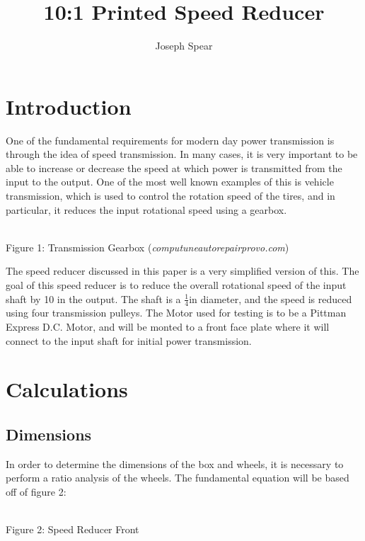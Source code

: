 \documentclass{article}
\begin{document}
\title{10:1 Printed Speed Reducer}
\author{Joseph Spear}

\maketitle


\section{Introduction}
One of the fundamental requirements for modern day power transmission is through the idea of speed transmission. In many cases, it is very important to be able to increase or decrease the speed at which power is transmitted from the input to the output. One of the most well known examples of this is vehicle transmission, which is used to control the rotation speed of the tires, and in particular, it reduces the input rotational speed using a gearbox.

\begin{center}
\\
\scriptsize{
Figure 1: Transmission Gearbox (\textit{computuneautorepairprovo.com})
}
\end{center}

The speed reducer discussed in this paper is a very simplified version of this. The goal of this speed reducer is to reduce the overall rotational speed of the input shaft by 10 in the output. The shaft is a $\frac{1}{4}$in diameter, and the speed is reduced using four transmission pulleys. The Motor used for testing is to be a Pittman Express D.C. Motor, and will be monted to a front face plate where it will connect to the input shaft for initial power transmission. 

\section{Calculations}
\subsection{Dimensions}
In order to determine the dimensions of the box and wheels, it is necessary to perform a ratio analysis of the wheels. The fundamental equation will be based off of figure 2:

\begin{center}
\\
\scriptsize{
Figure 2: Speed Reducer Front
}
\end{center}
\end{document}
